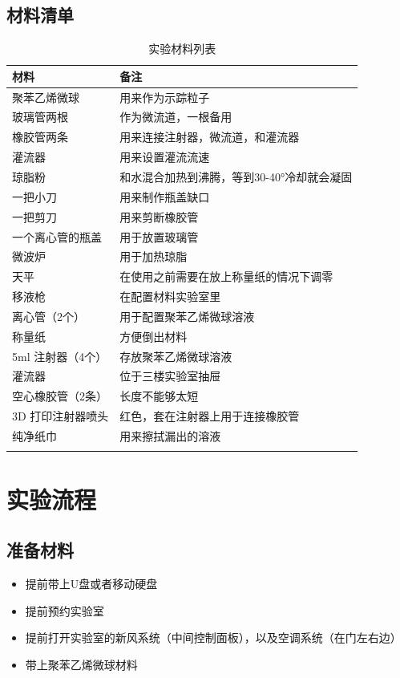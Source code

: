 \documentclass[12pt]{article}
\begin{document}
\subsection{材料清单}
{
    \footnotesize
    \begin{longtable}{@{} p{5cm} p{10cm} @{}}
        \toprule
        \textbf{材料} & \textbf{备注} \\ 
        \midrule
        聚苯乙烯微球 & 用来作为示踪粒子 \\
        玻璃管两根 & 作为微流道，一根备用 \\
        橡胶管两条 & 用来连接注射器，微流道，和灌流器 \\
        灌流器 & 用来设置灌流流速 \\
        琼脂粉 & 和水混合加热到沸腾，等到30-40°冷却就会凝固 \\
        一把小刀 & 用来制作瓶盖缺口 \\
        一把剪刀 & 用来剪断橡胶管 \\
        一个离心管的瓶盖 & 用于放置玻璃管 \\
        微波炉 & 用于加热琼脂 \\
        天平 & 在使用之前需要在放上称量纸的情况下调零 \\ 
        移液枪 & 在配置材料实验室里 \\ 
        离心管（2个） & 用于配置聚苯乙烯微球溶液 \\ 
        称量纸 & 方便倒出材料 \\ 
        5ml 注射器（4个） & 存放聚苯乙烯微球溶液 \\ 
        灌流器 & 位于三楼实验室抽屉 \\ 
        空心橡胶管（2条） & 长度不能够太短 \\ 
        3D 打印注射器喷头 & 红色，套在注射器上用于连接橡胶管 \\ 
        纯净纸巾 & 用来擦拭漏出的溶液 \\ 
        \bottomrule
        \caption{实验材料列表} \\
    \end{longtable}
}

\section{实验流程}

\subsection{准备材料}
\begin{itemize}
    \item 提前带上U盘或者移动硬盘
    \item 提前预约实验室
    \item 提前打开实验室的新风系统（中间控制面板），以及空调系统（在门左右边）
    \item 带上聚苯乙烯微球材料
\end{itemize}
\end{document}
